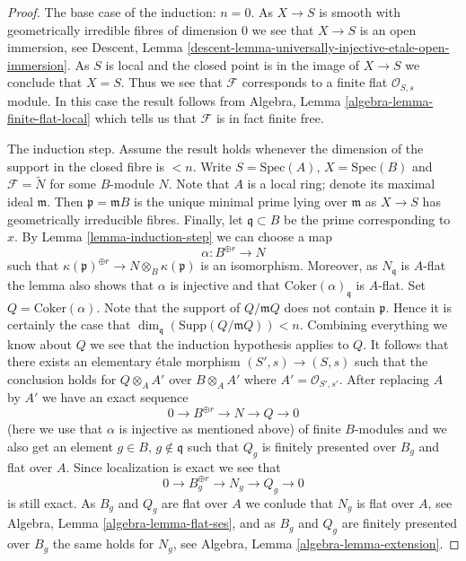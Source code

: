 \begin{proof}
\medskip\noindent
The base case of the induction: $n = 0$.
As $X \to S$ is smooth with geometrically
irredible fibres of dimension $0$ we see that $X \to S$ is an open
immersion, see
Descent, Lemma \ref{descent-lemma-universally-injective-etale-open-immersion}.
As $S$ is local and the closed point is in the image of $X \to S$
we conclude that $X = S$. Thus we see that $\mathcal{F}$ corresponds
to a finite flat $\mathcal{O}_{S, s}$ module. In this case the result
follows from
Algebra, Lemma \ref{algebra-lemma-finite-flat-local}
which tells us that $\mathcal{F}$ is in fact finite free.

\medskip\noindent
The induction step. Assume the result holds whenever the dimension
of the support in the closed fibre is $< n$. Write $S = \text{Spec}(A)$,
$X = \text{Spec}(B)$ and $\mathcal{F} = \widetilde{N}$ for some $B$-module
$N$. Note that $A$ is a local ring; denote its maximal ideal $\mathfrak m$.
Then $\mathfrak p = \mathfrak mB$ is the unique minimal prime lying over
$\mathfrak m$ as $X \to S$ has geometrically irreducible fibres. Finally,
let $\mathfrak q \subset B$ be the prime corresponding to $x$. By
Lemma \ref{lemma-induction-step}
we can choose a map
$$
\alpha : B^{\oplus r} \to N
$$
such that $\kappa(\mathfrak p)^{\oplus r} \to N \otimes_B \kappa(\mathfrak p)$
is an isomorphism. Moreover, as $N_{\mathfrak q}$ is $A$-flat the lemma
also shows that $\alpha$ is injective and that
$\text{Coker}(\alpha)_{\mathfrak q}$ is $A$-flat.
Set $Q = \text{Coker}(\alpha)$. Note that the support of $Q/\mathfrak mQ$
does not contain $\mathfrak p$. Hence it is certainly the case that
$\dim_{\mathfrak q}(\text{Supp}(Q/\mathfrak mQ)) < n$.
Combining everything we know about $Q$ we see
that the induction hypothesis applies to $Q$. It follows that there exists
an elementary \'etale morphism $(S', s) \to (S, s)$ such that the conclusion
holds for $Q \otimes_A A'$ over $B \otimes_A A'$ where
$A' = \mathcal{O}_{S', s'}$. After replacing $A$ by $A'$ we have an
exact sequence
$$
0 \to B^{\oplus r} \to N \to Q \to 0
$$
(here we use that $\alpha$ is injective as mentioned above)
of finite $B$-modules and we also get an element
$g \in B$, $g \not \in \mathfrak q$ such that
$Q_g$ is finitely presented over $B_g$ and flat over $A$. Since localization
is exact we see that
$$
0 \to B_g^{\oplus r} \to N_g \to Q_g \to 0
$$
is still exact. As $B_g$ and $Q_g$ are flat over $A$ we conlude that
$N_g$ is flat over $A$, see
Algebra, Lemma \ref{algebra-lemma-flat-ses},
and as $B_g$ and $Q_g$ are finitely presented over $B_g$ the same holds
for $N_g$, see
Algebra, Lemma \ref{algebra-lemma-extension}.
\end{proof}

